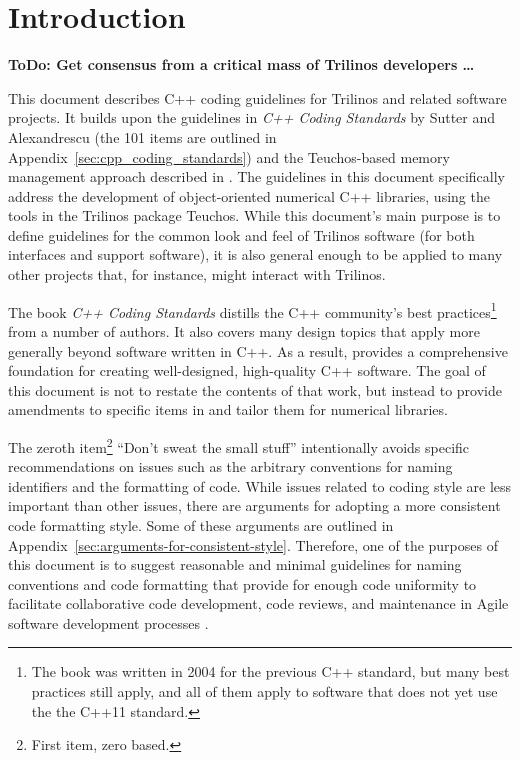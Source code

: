 %
\section{Introduction}
%

{}\textbf{ToDo: Get consensus from a critical mass of Trilinos
developers \dots}

This document describes C++ coding guidelines for Trilinos and related
software projects.  It builds upon the guidelines in \emph{C++ Coding
  Standards} by Sutter and Alexandrescu {}\cite{C++CodingStandards05}
(the 101 items are outlined in
Appendix~\ref{sec:cpp_coding_standards}) and the Teuchos-based memory
management approach described in
{}\cite{TeuchosMemoryManagementGuide}.  The guidelines in this
document specifically address the development of object-oriented
numerical C++ libraries, using the tools in the Trilinos package
Teuchos.  While this document's main purpose is to define guidelines
for the common look and feel of Trilinos software (for both interfaces
and support software), it is also general enough to be applied to many
other projects that, for instance, might interact with Trilinos.

The book \emph{C++ Coding Standards} {}\cite{C++CodingStandards05}
distills the C++ community's best practices\footnote{The book was
  written in 2004 for the previous C++ standard, but many best
  practices still apply, and all of them apply to software that does
  not yet use the the C++11 standard.} from a number of authors. It
also covers many design topics that apply more generally beyond
software written in C++.  As a result, {}\cite{C++CodingStandards05}
provides a comprehensive foundation for creating well-designed,
high-quality C++ software.  The goal of this document is not to
restate the contents of that work, but instead to provide amendments
to specific items in {}\cite{C++CodingStandards05} and tailor them for
numerical libraries.  

The zeroth item\footnote{First item, zero based.} ``Don't sweat the
small stuff'' intentionally avoids specific recommendations on issues
such as the arbitrary conventions for naming identifiers and the
formatting of code.  While issues related to coding style are less
important than other issues, there are arguments for adopting a more
consistent code formatting style.  Some of these arguments are
outlined in Appendix~\ref{sec:arguments-for-consistent-style}.
Therefore, one of the purposes of this document is to suggest
reasonable and minimal guidelines for naming conventions and code
formatting that provide for enough code uniformity to facilitate
collaborative code development, code reviews, and maintenance in Agile
software development processes
{}\cite{ExtremeProgrammingExplained2nd04}.

